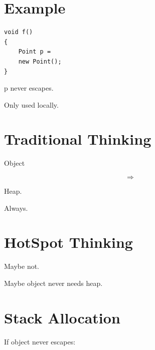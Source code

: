 \documentclass[11pt,a4paper]{book}
\begin{document}

\section{Example}

\begin{verbatim} 
void f()
{
    Point p =
    new Point();
}
\end{verbatim}


p never escapes.


Only used locally.


\section{Traditional Thinking}

Object

\[
\Rightarrow
\]

Heap.


Always.


\section{HotSpot Thinking}

Maybe not.


Maybe object never needs heap.


\section{Stack Allocation}

If object never escapes:

\end{document}

